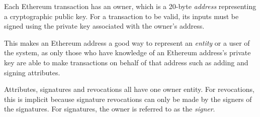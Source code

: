 \documentclass[12pt,a4paper]{report}
\begin{document}
	Each Ethereum transaction has an owner, which is a 20-byte \textit{address} representing a cryptographic public key.\cite{3} For a transaction to be valid, its inputs must be signed using the private key associated with the owner's address.
	
	This makes an Ethereum address a good way to represent an \textit{entity} or a user of the system, as only those who have knowledge of an Ethereum address's private key are able to make transactions on behalf of that address such as adding and signing attributes.
	
	Attributes, signatures and revocations all have one owner entity. For revocations, this is implicit because signature revocations can only be made by the signers of the signatures. For signatures, the owner is referred to as the \textit{signer}.
	
\end{document}

